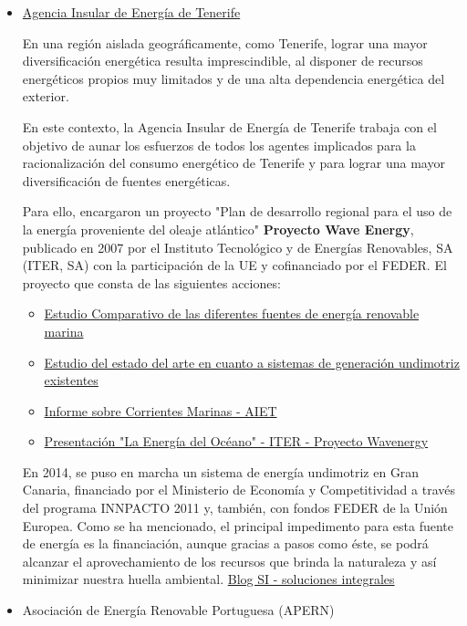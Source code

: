 \begin{itemize}
\item
  \href{http://www.agenergia.org/index.php?section=20}{Agencia Insular
  de Energía de Tenerife}

  En una región aislada geográficamente, como Tenerife, lograr una mayor
  diversificación energética resulta imprescindible, al disponer de
  recursos energéticos propios muy limitados y de una alta dependencia
  energética del exterior.

  En este contexto, la Agencia Insular de Energía de Tenerife trabaja
  con el objetivo de aunar los esfuerzos de todos los agentes implicados
  para la racionalización del consumo energético de Tenerife y para
  lograr una mayor diversificación de fuentes energéticas.

  Para ello, encargaron un proyecto "Plan de desarrollo regional para el
  uso de la energía proveniente del oleaje atlántico" \textbf{Proyecto
  Wave Energy}, publicado en 2007 por el Instituto Tecnológico y de
  Energías Renovables, SA (ITER, SA) con la participación de la UE y
  cofinanciado por el FEDER. El proyecto que consta de las siguientes
  acciones:

  \begin{itemize}
  \item
    \href{http://www.agenergia.org/index.php?action=view\&id=53\&module=resourcesmodule\&src=\%40random49140d138ac53}{Estudio
    Comparativo de las diferentes fuentes de energía renovable marina}
  \item
    \href{http://www.agenergia.org/index.php?action=view\&id=54\&module=resourcesmodule\&src=\%40random49140d138ac53}{Estudio
    del estado del arte en cuanto a sistemas de generación undimotriz
    existentes}
  \item
    \href{http://www.agenergia.org/index.php?action=view\&id=276\&module=resourcesmodule\&src=\%40random49140d138ac53}{Informe
    sobre Corrientes Marinas - AIET}
  \item
    \href{http://www.agenergia.org/index.php?action=view\&id=56\&module=resourcesmodule\&src=\%40random49140d138ac53}{Presentación
    "La Energía del Océano" - ITER - Proyecto Wavenergy}
  \end{itemize}

  En 2014, se puso en marcha un sistema de energía undimotriz en Gran
  Canaria, financiado por el Ministerio de Economía y Competitividad a
  través del programa INNPACTO 2011 y, también, con fondos FEDER de la
  Unión Europea. Como se ha mencionado, el principal impedimento para
  esta fuente de energía es la financiación, aunque gracias a pasos como
  éste, se podrá alcanzar el aprovechamiento de los recursos que brinda
  la naturaleza y así minimizar nuestra huella ambiental.
  \href{https://www.solucionesintegralesendesa.com/blog/equipamiento-hogar/ahorro-hogar/energia-undimotriz-el-poder-de-las-olas/}{Blog
  SI - soluciones integrales}
\item
  Asociación de Energía Renovable Portuguesa (APERN)


\end{itemize}
